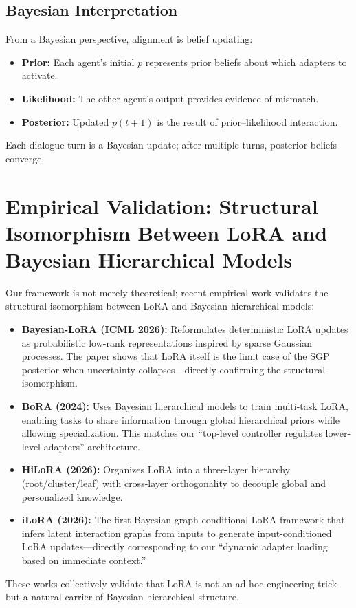 \documentclass[11pt, a4paper]{article}
\begin{document}
\subsection{Bayesian Interpretation}
From a Bayesian perspective, alignment is belief updating:
\begin{itemize}
  \item \textbf{Prior:} Each agent's initial $p$ represents prior beliefs about which adapters to activate.
  \item \textbf{Likelihood:} The other agent's output provides evidence of mismatch.
  \item \textbf{Posterior:} Updated $p(t{+}1)$ is the result of prior--likelihood interaction.
\end{itemize}
Each dialogue turn is a Bayesian update; after multiple turns, posterior beliefs converge.

\section{Empirical Validation: Structural Isomorphism Between LoRA and Bayesian Hierarchical Models}
Our framework is not merely theoretical; recent empirical work validates the structural isomorphism between LoRA and Bayesian hierarchical models:
\begin{itemize}
  \item \textbf{Bayesian-LoRA (ICML 2026):} Reformulates deterministic LoRA updates as probabilistic low-rank representations inspired by sparse Gaussian processes. The paper shows that LoRA itself is the limit case of the SGP posterior when uncertainty collapses---directly confirming the structural isomorphism.
  \item \textbf{BoRA (2024):} Uses Bayesian hierarchical models to train multi-task LoRA, enabling tasks to share information through global hierarchical priors while allowing specialization. This matches our ``top-level controller regulates lower-level adapters'' architecture.
  \item \textbf{HiLoRA (2026):} Organizes LoRA into a three-layer hierarchy (root/cluster/leaf) with cross-layer orthogonality to decouple global and personalized knowledge.
  \item \textbf{iLoRA (2026):} The first Bayesian graph-conditional LoRA framework that infers latent interaction graphs from inputs to generate input-conditioned LoRA updates---directly corresponding to our ``dynamic adapter loading based on immediate context.''
\end{itemize}
These works collectively validate that LoRA is not an ad-hoc engineering trick but a natural carrier of Bayesian hierarchical structure.
\end{document}
